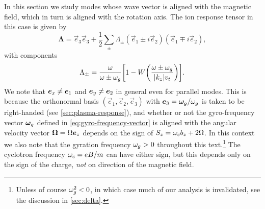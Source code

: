 \documentclass[aps,pre,notitlepage,amsmath,amssymb,amsfonts,nobibnotes,nofootinbib]{revtex4-1}
\begin{document}
In this section we study modes whose wave vector is aligned with the magnetic
field, which in turn is aligned with the rotation axis. The ion response
tensor in this case is given by
\begin{equation}
  \label{eq:parallel-response}
  \mathbf{\Lambda} =
  \vec{e}_3\vec{e}_3 + \frac{1}{2}\sum_\pm\Lambda^{}_\pm
  (\vec{e}_1\pm i\vec{e}_2)(\vec{e}_1\mp i\vec{e}_2),
\end{equation}
with components
\begin{equation}
  \label{eq:circular-components}
  \Lambda_\pm = \frac{\omega}{\omega\pm\omg}
  \left[1 - W\left(\frac{\omega\pm\omg}{|k_z|\vt}\right)\right].
\end{equation}
We note that $\bm{e}_x\ne\bm{e}_1$ and $\bm{e}_y\ne\bm{e}_2$ in general even for
parallel modes. This is because the orthonormal basis
$(\vec{e}_1,\vec{e}_2,\vec{e}_3)$ with $\bm{e}_3=\bm{\omega}_g/\omega_g$ is taken to be
right-handed (see \cref{sec:plasma-response}), and whether or not the
gyro-frequency vector $\bm{\omega}_g$ defined in \cref{eq:gyro-frequency-vector} is
aligned with the angular velocity vector $\bm{\Omega}=\Omega\bm{e}_z$ depends on
the sign of $S_z=\omega_c{}b_z+2\Omega$. In this context we also note that the
gyration frequency $\omega_g>0$ throughout this text.\footnote{Unless of course
  $\omega_g^2<0$, in which case much of our analysis is invalidated, see the
  discussion in \cref{sec:delta}.} The cyclotron frequency $\omega_c=eB/m$ can
have either sign, but this depends only on the sign of the charge, \emph{not}
on direction of the magnetic field.
\end{document}
